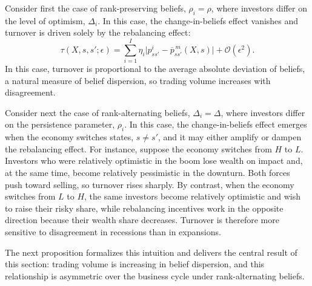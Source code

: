 {Consider first the case of rank-preserving beliefs, $\rho_i = \rho$, where investors differ on the level of optimism, $\Delta_i$. 
In this case, the change-in-beliefs effect vanishes and turnover is driven
solely by the rebalancing effect:
\begin{equation}
    \tau(X,s,s';\epsilon)
    =
    \sum_{i=1}^I \eta_i
    \big|p_{ss'}^i-\overline{p}^{\,m}_{ss'}(X,s)\big|
    +\mathcal{O}(\epsilon^2).
    \nonumber
\end{equation}
In this case, turnover is proportional to the average absolute deviation of beliefs, a natural
measure of belief dispersion, so trading volume increases with disagreement.

Consider next the case of rank-alternating beliefs, $\Delta_i = \Delta$, where investors differ on the persistence parameter, $\rho_i$. 
In this case, the change-in-beliefs effect emerges when the economy switches states, $s\neq s'$, and it may either
amplify or dampen the rebalancing effect. 
For instance, suppose the
economy switches from $H$ to $L$. Investors who were relatively
optimistic in the boom lose wealth on impact and, at the same time, become relatively pessimistic in
the downturn. Both forces push toward selling, so turnover rises sharply. By contrast, when the
economy switches from $L$ to $H$, the same investors become relatively optimistic and wish to raise
their risky share, while rebalancing incentives work in the opposite direction because their wealth share decreases. Turnover is therefore more sensitive to disagreement in recessions than in expansions.

The next proposition formalizes this intuition and delivers the central result of this
section: trading volume is increasing in belief dispersion, and this relationship is asymmetric over the
business cycle under rank-alternating beliefs.

}
